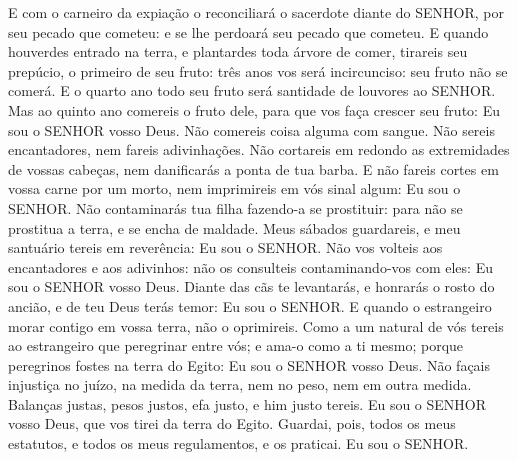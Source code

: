 {{  E com o carneiro da expiação o reconciliará o sacerdote diante do SENHOR, por seu pecado que cometeu: e se lhe perdoará seu pecado que cometeu.
  E quando houverdes entrado na terra, e plantardes toda árvore de comer, tirareis seu prepúcio, o primeiro de seu fruto: três anos vos será incircunciso: seu fruto não se comerá.
  E o quarto ano todo seu fruto será santidade de louvores ao SENHOR.
  Mas ao quinto ano comereis o fruto dele, para que vos faça crescer seu fruto: Eu sou o SENHOR vosso Deus.
  Não comereis coisa alguma com sangue. Não sereis encantadores, nem fareis adivinhações.
  Não cortareis em redondo as extremidades de vossas cabeças, nem danificarás a ponta de tua barba.
  E não fareis cortes em vossa carne por um morto, nem imprimireis em vós sinal algum: Eu sou o SENHOR. %
  Não contaminarás tua filha fazendo-a se prostituir: para {} não se prostitua a terra, e se encha de maldade.
  Meus sábados guardareis, e meu santuário tereis em reverência: Eu sou o SENHOR.
  Não vos volteis aos encantadores e aos adivinhos: não os consulteis contaminando-vos com eles: Eu sou o SENHOR vosso Deus.
  Diante das cãs te levantarás, e honrarás o rosto do ancião, e de teu Deus terás temor: Eu sou o SENHOR.
  E quando o estrangeiro morar contigo em vossa terra, não o oprimireis.
  Como a um natural de vós tereis ao estrangeiro que peregrinar entre vós; e ama-o como a ti mesmo; porque peregrinos fostes na terra do Egito: Eu sou o SENHOR vosso Deus.
  Não façais injustiça no juízo, na medida da terra, nem no peso, nem em outra medida.
  Balanças justas, pesos justos, efa justo, e him justo tereis. Eu sou o SENHOR vosso Deus, que vos tirei da terra do Egito.
  Guardai, pois, todos os meus estatutos, e todos os meus regulamentos, e os praticai. Eu sou o SENHOR}.
\par }

